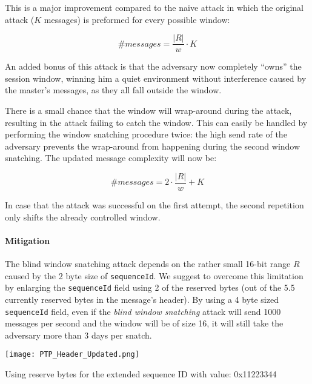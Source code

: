 \documentclass[11pt]{article}
\begin{document}
This is a major improvement compared to the naive attack in which the original attack ($K$ messages) is preformed for every possible window:

\begin{equation} \label{NaiveComplex}
\#messages=\frac{|R|}{w} \cdot K
\end{equation}

An added bonus of this attack is that the adversary now completely ``owns'' the session window, winning him a quiet environment without interference caused by the master's messages, as they all fall outside the window.

There is a small chance that the window will wrap-around during the attack, resulting in the attack failing to catch the window. This can easily be handled by performing the window snatching procedure twice: the high send rate of the adversary prevents the wrap-around from happening during the second window snatching. The updated message complexity will now be:

\begin{equation} \label{FinalWindowComplex}
\#messages=2 \cdot \frac{|R|}{w} + K
\end{equation}

In case that the attack was successful on the first attempt, the second repetition only shifts the already controlled window.

\paragraph{Mitigation}\label{time:scenrio4:mit}

The blind window snatching attack depends on the rather small 16-bit range $R$ caused by the 2 byte size of \texttt{sequenceId}. We suggest to overcome this limitation by enlarging the \texttt{sequenceId} field using 2 of the reserved bytes (out of the 5.5 currently reserved bytes in the message's header). By using a 4 byte sized \texttt{sequenceId} field, even if the \emph{blind window snatching} attack will send 1000 messages per second and the window will be of size 16, it will still take the adversary more than 3 days per snatch.

\begin{table}[t]

\centerline{\texttt{[image: PTP\_Header\_Updated.png]}}
\caption{Using reserve bytes for the extended sequence ID with value: 0x11223344}
\label{PTP Header update}

\end{table}
\end{document}
